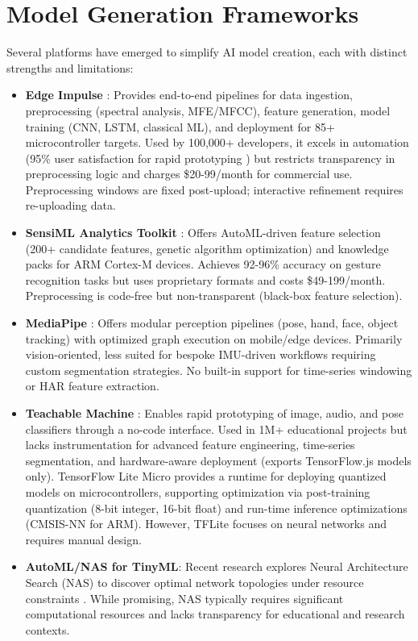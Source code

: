 \section{Model Generation Frameworks}
Several platforms have emerged to simplify AI model creation, each with distinct strengths and limitations:
\begin{itemize}
    \item \textbf{Edge Impulse} \cite{web:Edge_Impulse}: Provides end-to-end pipelines for data ingestion, preprocessing (spectral analysis, MFE/MFCC), feature generation, model training (CNN, LSTM, classical ML), and deployment for 85+ microcontroller targets. Used by 100,000+ developers, it excels in automation (95\% user satisfaction for rapid prototyping \cite{merenda2020edge}) but restricts transparency in preprocessing logic and charges \$20-99/month for commercial use. Preprocessing windows are fixed post-upload; interactive refinement requires re-uploading data.
    \item \textbf{SensiML Analytics Toolkit} \cite{web:SensiML}: Offers AutoML-driven feature selection (200+ candidate features, genetic algorithm optimization) and knowledge packs for ARM Cortex-M devices. Achieves 92-96\% accuracy on gesture recognition tasks but uses proprietary formats and costs \$49-199/month. Preprocessing is code-free but non-transparent (black-box feature selection).
    \item \textbf{MediaPipe} \cite{web:Google_Mediapipe}: Offers modular perception pipelines (pose, hand, face, object tracking) with optimized graph execution on mobile/edge devices. Primarily vision-oriented, less suited for bespoke IMU-driven workflows requiring custom segmentation strategies. No built-in support for time-series windowing or HAR feature extraction.
    \item \textbf{Teachable Machine} \cite{web:Google_TeachableMachine}: Enables rapid prototyping of image, audio, and pose classifiers through a no-code interface. Used in 1M+ educational projects but lacks instrumentation for advanced feature engineering, time-series segmentation, and hardware-aware deployment (exports TensorFlow.js models only).
TensorFlow Lite Micro \cite{david2020tensorflow} provides a runtime for deploying quantized models on microcontrollers, supporting optimization via post-training quantization (8-bit integer, 16-bit float) and run-time inference optimizations (CMSIS-NN for ARM). However, TFLite focuses on neural networks and requires manual design.
    \item \textbf{AutoML/NAS for TinyML}: Recent research explores Neural Architecture Search (NAS) to discover optimal network topologies under resource constraints \cite{cai2018proxylessnas}. While promising, NAS typically requires significant computational resources and lacks transparency for educational and research contexts.
\end{itemize}
